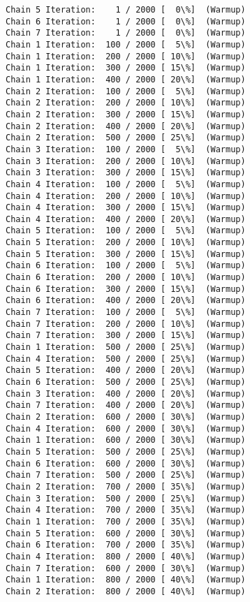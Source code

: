 \documentclass[11pt]{article}
\begin{document}
    \begin{Verbatim}[commandchars=\\\{\}]
Chain 5 Iteration:    1 / 2000 [  0\%]  (Warmup)
Chain 6 Iteration:    1 / 2000 [  0\%]  (Warmup)
Chain 7 Iteration:    1 / 2000 [  0\%]  (Warmup)
Chain 1 Iteration:  100 / 2000 [  5\%]  (Warmup)
Chain 1 Iteration:  200 / 2000 [ 10\%]  (Warmup)
Chain 1 Iteration:  300 / 2000 [ 15\%]  (Warmup)
Chain 1 Iteration:  400 / 2000 [ 20\%]  (Warmup)
Chain 2 Iteration:  100 / 2000 [  5\%]  (Warmup)
Chain 2 Iteration:  200 / 2000 [ 10\%]  (Warmup)
Chain 2 Iteration:  300 / 2000 [ 15\%]  (Warmup)
Chain 2 Iteration:  400 / 2000 [ 20\%]  (Warmup)
Chain 2 Iteration:  500 / 2000 [ 25\%]  (Warmup)
Chain 3 Iteration:  100 / 2000 [  5\%]  (Warmup)
Chain 3 Iteration:  200 / 2000 [ 10\%]  (Warmup)
Chain 3 Iteration:  300 / 2000 [ 15\%]  (Warmup)
Chain 4 Iteration:  100 / 2000 [  5\%]  (Warmup)
Chain 4 Iteration:  200 / 2000 [ 10\%]  (Warmup)
Chain 4 Iteration:  300 / 2000 [ 15\%]  (Warmup)
Chain 4 Iteration:  400 / 2000 [ 20\%]  (Warmup)
Chain 5 Iteration:  100 / 2000 [  5\%]  (Warmup)
Chain 5 Iteration:  200 / 2000 [ 10\%]  (Warmup)
Chain 5 Iteration:  300 / 2000 [ 15\%]  (Warmup)
Chain 6 Iteration:  100 / 2000 [  5\%]  (Warmup)
Chain 6 Iteration:  200 / 2000 [ 10\%]  (Warmup)
Chain 6 Iteration:  300 / 2000 [ 15\%]  (Warmup)
Chain 6 Iteration:  400 / 2000 [ 20\%]  (Warmup)
Chain 7 Iteration:  100 / 2000 [  5\%]  (Warmup)
Chain 7 Iteration:  200 / 2000 [ 10\%]  (Warmup)
Chain 7 Iteration:  300 / 2000 [ 15\%]  (Warmup)
Chain 1 Iteration:  500 / 2000 [ 25\%]  (Warmup)
Chain 4 Iteration:  500 / 2000 [ 25\%]  (Warmup)
Chain 5 Iteration:  400 / 2000 [ 20\%]  (Warmup)
Chain 6 Iteration:  500 / 2000 [ 25\%]  (Warmup)
Chain 3 Iteration:  400 / 2000 [ 20\%]  (Warmup)
Chain 7 Iteration:  400 / 2000 [ 20\%]  (Warmup)
Chain 2 Iteration:  600 / 2000 [ 30\%]  (Warmup)
Chain 4 Iteration:  600 / 2000 [ 30\%]  (Warmup)
Chain 1 Iteration:  600 / 2000 [ 30\%]  (Warmup)
Chain 5 Iteration:  500 / 2000 [ 25\%]  (Warmup)
Chain 6 Iteration:  600 / 2000 [ 30\%]  (Warmup)
Chain 7 Iteration:  500 / 2000 [ 25\%]  (Warmup)
Chain 2 Iteration:  700 / 2000 [ 35\%]  (Warmup)
Chain 3 Iteration:  500 / 2000 [ 25\%]  (Warmup)
Chain 4 Iteration:  700 / 2000 [ 35\%]  (Warmup)
Chain 1 Iteration:  700 / 2000 [ 35\%]  (Warmup)
Chain 5 Iteration:  600 / 2000 [ 30\%]  (Warmup)
Chain 6 Iteration:  700 / 2000 [ 35\%]  (Warmup)
Chain 4 Iteration:  800 / 2000 [ 40\%]  (Warmup)
Chain 7 Iteration:  600 / 2000 [ 30\%]  (Warmup)
Chain 1 Iteration:  800 / 2000 [ 40\%]  (Warmup)
Chain 2 Iteration:  800 / 2000 [ 40\%]  (Warmup)

\end{Verbatim}
\end{document}
